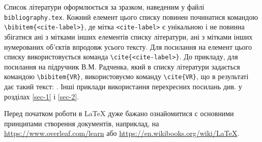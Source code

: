Список літератури оформлюється за зразком, наведеним у файлі {\color{bluegreen}\verb|bibliography.tex|}. Кожний елемент цього списку повинен починатися командою {\color{bluegreen}\verb|\bibitem{<cite-label>}|}, де мітка {\color{bluegreen}\verb|<cite-label>|} є унікальною і не повинна збігатися ані з мітками інших елементів списку літератури, ані з мітками інших нумерованих об'єктів впродовж усього тексту. Для посилання на елемент цього списку використовується команда {\color{bluegreen}\verb|\cite{<cite-label>}|}. До прикладу, для посилання на підручник В.М. Радченка, який в списку літератури задається командою
{\color{bluegreen}\verb|\bibitem{VR}|},
використовуємо команду {\color{bluegreen}\verb|\cite{VR}|}, що в результаті дає такий текст: \cite{VR}.
Інші приклади використання перехресних посилань див. у розділах \ref{sec-1} і \ref{sec-2}.

Перед початком роботи в \LaTeX{} дуже бажано ознайомитися с основними принципами створення документів, наприклад, на \url{https://www.overleaf.com/learn} або \url{https://en.wikibooks.org/wiki/LaTeX}.  


